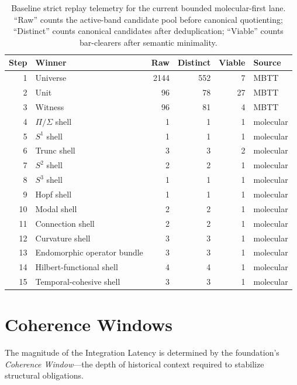 \documentclass[11pt,a4paper]{article}
\theoremstyle{plain}
\theoremstyle{definition}
\theoremstyle{remark}
\begin{document}
\begin{table}[tbp]
\centering
\caption{Baseline strict replay telemetry for the current bounded molecular-first lane.  ``Raw'' counts the active-band candidate pool before canonical quotienting; ``Distinct'' counts canonical candidates after deduplication; ``Viable'' counts bar-clearers after semantic minimality.}
\label{tab:search-telemetry}
\small
\begin{tabular}{@{}r l rrr l@{}}
\toprule
Step & Winner & Raw & Distinct & Viable & Source \\
\midrule
1  & Universe    & 2144 & 552 & 7 & MBTT \\
2  & Unit        & 96   & 78  & 27 & MBTT \\
3  & Witness     & 96   & 81  & 4 & MBTT \\
4  & $\Pi/\Sigma$ shell & 1 & 1 & 1 & molecular \\
5  & $S^1$ shell & 1 & 1 & 1 & molecular \\
6  & Trunc shell & 3 & 3 & 2 & molecular \\
7  & $S^2$ shell & 2 & 2 & 1 & molecular \\
8  & $S^3$ shell & 1 & 1 & 1 & molecular \\
9  & Hopf shell  & 1 & 1 & 1 & molecular \\
10 & Modal shell & 2 & 2 & 1 & molecular \\
11 & Connection shell & 2 & 2 & 1 & molecular \\
12 & Curvature shell & 3 & 3 & 1 & molecular \\
13 & Endomorphic operator bundle & 3 & 3 & 1 & molecular \\
14 & Hilbert-functional shell & 4 & 4 & 1 & molecular \\
15 & Temporal-cohesive shell & 3 & 3 & 1 & molecular \\
\bottomrule
\end{tabular}
\end{table}

\section{Coherence Windows}
\label{sec:coherence}

The magnitude of the Integration Latency is determined by the foundation's \emph{Coherence Window}---the depth of historical context required to stabilize structural obligations.
\end{document}
